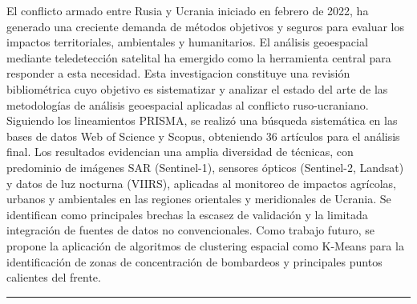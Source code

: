 \documentclass[12pt, a4paper]{article}
\begin{document}
\begin{minipage}[t]{0.63\textwidth}
  \vspace{0.2cm}
  {\small El conflicto armado entre Rusia y Ucrania iniciado en febrero de 2022, ha generado una creciente demanda de métodos objetivos y seguros para evaluar los impactos territoriales, ambientales y humanitarios. El análisis geoespacial mediante teledetección satelital ha emergido como la herramienta central para responder a esta necesidad. Esta investigacion constituye una revisión bibliométrica cuyo objetivo es sistematizar y analizar el estado del arte de las metodologías de análisis geoespacial aplicadas al conflicto ruso-ucraniano. Siguiendo los lineamientos PRISMA, se realizó una búsqueda sistemática en las bases de datos Web of Science y Scopus, obteniendo 36 artículos para el análisis final. Los resultados evidencian una amplia diversidad de técnicas, con predominio de imágenes SAR (Sentinel-1), sensores ópticos (Sentinel-2, Landsat) y datos de luz nocturna (VIIRS), aplicadas al monitoreo de impactos agrícolas, urbanos y ambientales en las regiones orientales y meridionales de Ucrania. Se identifican como principales brechas la escasez de validación y la limitada integración de fuentes de datos no convencionales. Como trabajo futuro, se propone la aplicación de algoritmos de clustering espacial como K-Means para la identificación de zonas de concentración de bombardeos y principales puntos calientes del frente.}

  \vspace{0.3cm}
  {\color{accent}\rule{\textwidth}{0.8pt}}

\end{minipage}
\hfill
\end{document}
